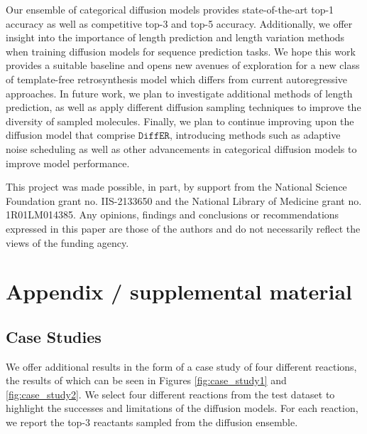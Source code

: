 \documentclass{article}
\newcommand{\ours}{$\texttt{DiffER}$\xspace}
\begin{document}
Our ensemble of categorical diffusion models provides state-of-the-art top-1 accuracy as well as competitive top-3 and top-5 accuracy.
Additionally, we offer insight into the importance of length prediction and length variation methods when training diffusion models for sequence prediction tasks.
We hope this work provides a suitable baseline and opens new avenues of exploration for a new class of template-free retrosynthesis model which differs from current autoregressive approaches. In future work, we plan to investigate additional methods of length prediction, as well as apply different diffusion sampling techniques to improve the diversity of sampled molecules. Finally, we plan to continue improving upon the diffusion model that comprise \ours, introducing methods such as adaptive noise scheduling \cite{yuan2022seqdiffuseq} as well as other advancements in categorical diffusion models to improve model performance.

\begin{ack}
This project was made possible, in part, by support from the National Science Foundation grant no. IIS-2133650 and the National Library of Medicine grant no. 1R01LM014385. Any opinions, findings and conclusions or recommendations expressed in this paper are those of the authors and do not necessarily reflect the views of the funding agency.
\end{ack}





\small




\appendix

\section{Appendix / supplemental material}


\subsection{Case Studies}
\label{sec:case_study}


We offer additional results in the form of a case study of four different reactions, the results of which can be seen in Figures \ref{fig:case_study1} and \ref{fig:case_study2}. We select four different reactions from the test dataset to highlight the successes and limitations of the diffusion models. For each reaction, we report the top-3 reactants sampled from the diffusion ensemble.
\end{document}
